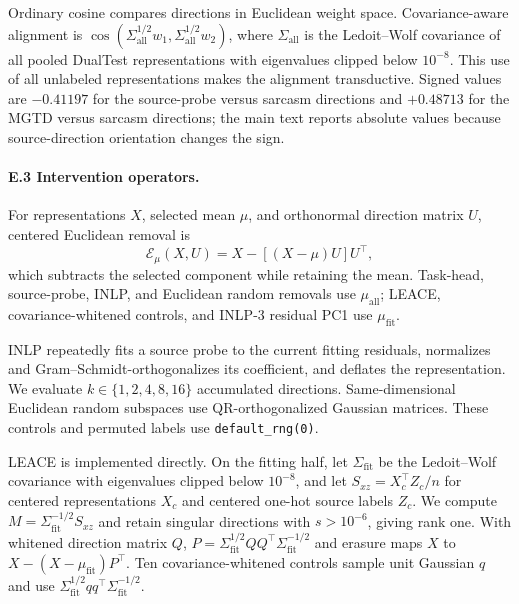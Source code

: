 Ordinary cosine compares directions in Euclidean weight space. Covariance-aware alignment is $\cos(\Sigma_{\mathrm{all}}^{1/2}w_1,\Sigma_{\mathrm{all}}^{1/2}w_2)$, where $\Sigma_{\mathrm{all}}$ is the Ledoit--Wolf covariance \citep{ledoit2004covariance} of all pooled DualTest representations with eigenvalues clipped below $10^{-8}$. This use of all unlabeled representations makes the alignment transductive. Signed values are $-0.41197$ for the source-probe versus sarcasm directions and $+0.48713$ for the MGTD versus sarcasm directions; the main text reports absolute values because source-direction orientation changes the sign.

\paragraph{E.3 Intervention operators.} For representations $X$, selected mean $\mu$, and orthonormal direction matrix $U$, centered Euclidean removal is
\begin{equation}
  \mathcal{E}_{\mu}(X,U)=X-[(X-\mu)U]U^{\top},
  \label{eq:centered-erasure}
\end{equation}
which subtracts the selected component while retaining the mean. Task-head, source-probe, INLP, and Euclidean random removals use $\mu_{\mathrm{all}}$; LEACE, covariance-whitened controls, and INLP-3 residual PC1 use $\mu_{\mathrm{fit}}$.

INLP \citep{ravfogel2020inlp} repeatedly fits a source probe to the current fitting residuals, normalizes and Gram--Schmidt-orthogonalizes its coefficient, and deflates the representation. We evaluate $k\in\{1,2,4,8,16\}$ accumulated directions. Same-dimensional Euclidean random subspaces use QR-orthogonalized Gaussian matrices. These controls and permuted labels use \texttt{default\_rng(0)}.

LEACE \citep{belrose2023leace} is implemented directly. On the fitting half, let $\Sigma_{\mathrm{fit}}$ be the Ledoit--Wolf covariance with eigenvalues clipped below $10^{-8}$, and let $S_{xz}=X_c^{\top}Z_c/n$ for centered representations $X_c$ and centered one-hot source labels $Z_c$. We compute $M=\Sigma_{\mathrm{fit}}^{-1/2}S_{xz}$ and retain singular directions with $s>10^{-6}$, giving rank one. With whitened direction matrix $Q$, $P=\Sigma_{\mathrm{fit}}^{1/2}QQ^{\top}\Sigma_{\mathrm{fit}}^{-1/2}$ and erasure maps $X$ to $X-(X-\mu_{\mathrm{fit}})P^{\top}$. Ten covariance-whitened controls sample unit Gaussian $q$ and use $\Sigma_{\mathrm{fit}}^{1/2}qq^{\top}\Sigma_{\mathrm{fit}}^{-1/2}$.

